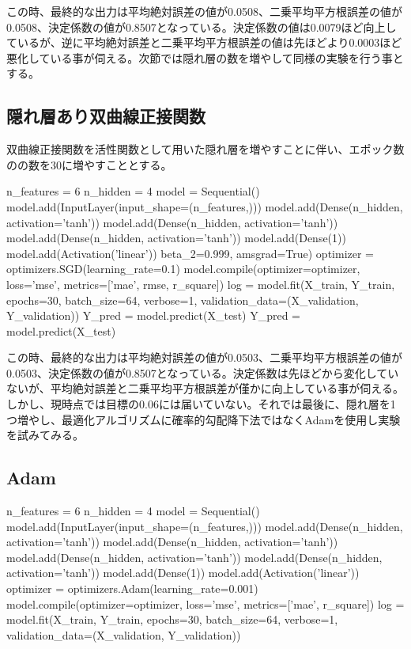 \documentclass{report}
\begin{document}
この時、最終的な出力は平均絶対誤差の値が0.0508、二乗平均平方根誤差の値が0.0508、決定係数の値が0.8507となっている。決定係数の値は0.0079ほど向上しているが、逆に平均絶対誤差と二乗平均平方根誤差の値は先ほどより0.0003ほど悪化している事が伺える。次節では隠れ層の数を増やして同様の実験を行う事とする。


\subsection{隠れ層あり双曲線正接関数}


双曲線正接関数を活性関数として用いた隠れ層を増やすことに伴い、エポック数のの数を30に増やすこととする。
\\


\begin{python}[caption=隠れそうあり双曲線正接関数]
n_features = 6
n_hidden   = 4
model = Sequential()
model.add(InputLayer(input_shape=(n_features,)))
model.add(Dense(n_hidden, activation='tanh'))
model.add(Dense(n_hidden, activation='tanh'))
model.add(Dense(n_hidden, activation='tanh'))
model.add(Dense(1))
model.add(Activation('linear'))
beta_2=0.999, amsgrad=True)
optimizer = optimizers.SGD(learning_rate=0.1)
model.compile(optimizer=optimizer,
              loss='mse', metrics=['mae', rmse, r_square])
log = model.fit(X_train, Y_train, epochs=30, batch_size=64, 
verbose=1,
         validation_data=(X_validation, Y_validation))
Y_pred = model.predict(X_test)
Y_pred = model.predict(X_test)
\end{python}


この時、最終的な出力は平均絶対誤差の値が0.0503、二乗平均平方根誤差の値が0.0503、決定係数の値が0.8507となっている。決定係数は先ほどから変化していないが、平均絶対誤差と二乗平均平方根誤差が僅かに向上している事が伺える。しかし、現時点では目標の0.06には届いていない。それでは最後に、隠れ層を1つ増やし、最適化アルゴリズムに確率的勾配降下法ではなくAdamを使用し実験を試みてみる。

\subsection{Adam}




\begin{python}[caption=最適化アルゴリズムの適用]
n_features = 6
n_hidden   = 4
model = Sequential()
model.add(InputLayer(input_shape=(n_features,)))
model.add(Dense(n_hidden, activation='tanh'))
model.add(Dense(n_hidden, activation='tanh'))
model.add(Dense(n_hidden, activation='tanh'))
model.add(Dense(n_hidden, activation='tanh'))
model.add(Dense(1))
model.add(Activation('linear'))
optimizer = optimizers.Adam(learning_rate=0.001)
model.compile(optimizer=optimizer,
              loss='mse', metrics=['mae', r_square])
log = model.fit(X_train, Y_train, epochs=30, batch_size=64, 
verbose=1,
         validation_data=(X_validation, Y_validation))
\end{python}
\end{document}
